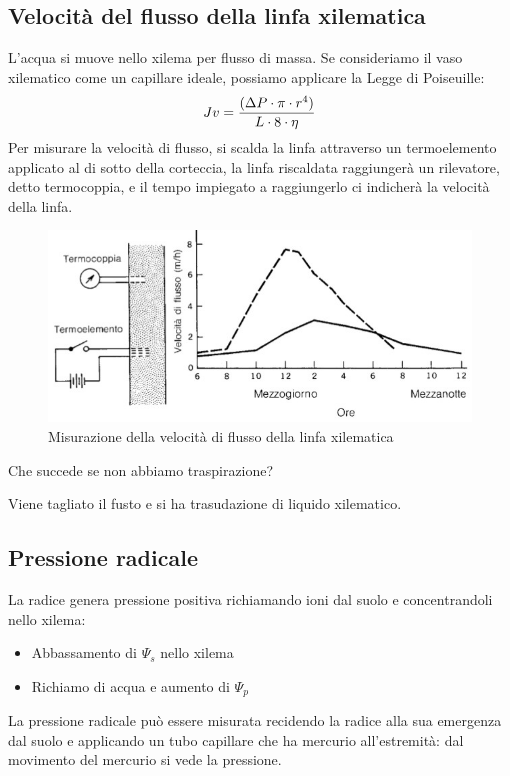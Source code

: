 \documentclass[a4paper,12pt]{book}
\begin{document}
\subsection{Velocità del flusso della linfa xilematica}
L'acqua si muove nello xilema per flusso di massa. Se consideriamo il vaso xilematico come un capillare ideale, possiamo applicare la Legge di Poiseuille:
\begin{equation}
Jv=\frac{(\Delta P \cdot \pi \cdot r^{4})}{L \cdot 8 \cdot \eta}
\centering
\end{equation}
Per misurare la velocità di flusso, si scalda la linfa attraverso un termoelemento applicato al di sotto della corteccia, la linfa riscaldata raggiungerà un rilevatore, detto termocoppia, e il tempo impiegato a raggiungerlo ci indicherà la velocità della linfa. 
\begin{figure}[H]
\centering
\includegraphics[scale=0.5]{immagini/velocita.jpg}
\caption{Misurazione della velocità di flusso della linfa xilematica}
\end{figure}

Che succede se non abbiamo traspirazione?

Viene tagliato il fusto e si ha trasudazione di liquido xilematico.

\subsection{Pressione radicale}
La radice genera pressione positiva richiamando ioni dal suolo e concentrandoli nello xilema:
\begin{itemize}
\item{Abbassamento di $\Psi_{s}$ nello xilema}
\item{Richiamo di acqua e aumento di $\Psi_{p}$ }
\end{itemize}
La pressione radicale può essere misurata recidendo la radice alla sua emergenza dal suolo e applicando un tubo capillare che ha mercurio all'estremità: dal movimento del mercurio si vede la pressione.
\end{document}
